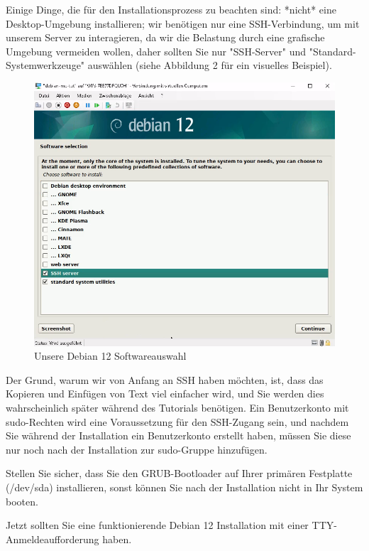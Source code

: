 \documentclass[]{article}
\begin{document}
Einige Dinge, die für den Installationsprozess zu beachten sind: *nicht* eine Desktop-Umgebung installieren; wir benötigen nur eine SSH-Verbindung, um mit unserem Server zu interagieren, da wir die Belastung durch eine grafische Umgebung vermeiden wollen, daher sollten Sie nur "SSH-Server" und "Standard-Systemwerkzeuge" auswählen (siehe Abbildung 2 für ein visuelles Beispiel).

\begin{figure}[h]
    \caption{Unsere Debian 12 Softwareauswahl}
    \centering
    \includegraphics[width=1\textwidth]{debian-software-selection}
\end{figure}
\FloatBarrier

Der Grund, warum wir von Anfang an SSH haben möchten, ist, dass das Kopieren und Einfügen von Text viel einfacher wird, und Sie werden dies wahrscheinlich später während des Tutorials benötigen. Ein Benutzerkonto mit sudo-Rechten wird eine Voraussetzung für den SSH-Zugang sein, und nachdem Sie während der Installation ein Benutzerkonto erstellt haben, müssen Sie diese nur noch nach der Installation zur sudo-Gruppe hinzufügen.

Stellen Sie sicher, dass Sie den GRUB-Bootloader auf Ihrer primären Festplatte (/dev/sda) installieren, sonst können Sie nach der Installation nicht in Ihr System booten.

Jetzt sollten Sie eine funktionierende Debian 12 Installation mit einer TTY-Anmeldeaufforderung haben.
\end{document}
